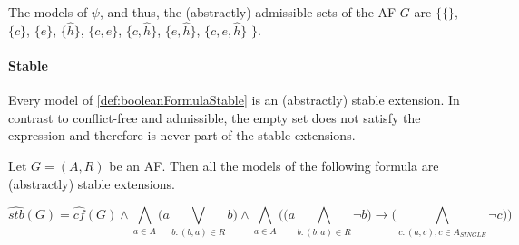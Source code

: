 \begin{example}
The models of $\psi$, and thus, the (abstractly) admissible sets of the AF $G$ are $\big\{ \{\}$, $\{c\}$, $\{e\}$, $\{\hat{h}\}$, $\{c, e\}$, $\{c, \hat{h}\}$, $\{e, \hat{h}\}$, $\{c, e, \hat{h}\}$ $\big\}$.
\end{example}



\paragraph{Stable} Every model of \cref{def:booleanFormulaStable} is an (abstractly) stable extension. In contrast to conflict-free and admissible, the empty set does not satisfy the expression and therefore is never part of the stable extensions.

\begin{definition}
    Let $G=(A,R)$ be an AF. Then all the models of the following formula are (abstractly) stable extensions.
    \begin{center}
        \[ \hat{stb}(G)=
        \hat{cf}(G) \land \bigwedge_{a \in A} \big( a \bigvee_{b:(b,a)\in R} b\big) \land \bigwedge_{a \in A} \big( \big(  a \bigwedge_{b:(b,a) \in R} \lnot b\big)  \rightarrow \big( \bigwedge_{c:(a,c), c \in A_{\!S\!I\!N\!G\!L\!E}} \lnot c\big) \big)
        \]
    \end{center}
    \label{def:booleanFormulaStable}
\end{definition}



